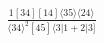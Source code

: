 \documentclass[varwidth, border=5pt]{standalone}
\begin{document}
\begin{my}
$\begin{gathered}
\scriptscriptstyle\frac{1[34][14]⟨35⟩⟨24⟩}{⟨34⟩^2[45]⟨3|1+2|3]}
\end{gathered}$
\end{my}
\end{document}

